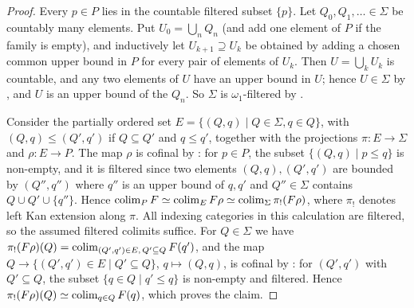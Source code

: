 	\begin{proof}
		Every $p \in P$ lies in the countable filtered subset $\{p\}$. Let $Q_0,Q_1,\dots \in \Sigma$ be countably many elements. Put $U_0 = \bigcup_n Q_n$ (and add one element of $P$ if the family is empty), and inductively let $U_{k+1} \supseteq U_k$ be obtained by adding a chosen common upper bound in $P$ for every pair of elements of $U_k$. Then $U = \bigcup_k U_k$ is countable, and any two elements of $U$ have an upper bound in $U$; hence $U \in \Sigma$ by , and $U$ is an upper bound of the $Q_n$. So $\Sigma$ is $\omega_1$-filtered by .

		Consider the partially ordered set $E = \{(Q,q) \mid Q \in \Sigma, q \in Q\}$, with $(Q,q) \leq (Q',q')$ if $Q \subseteq Q'$ and $q \leq q'$, together with the projections $\pi\colon E \to \Sigma$ and $\rho\colon E \to P$. The map $\rho$ is cofinal by : for $p \in P$, the subset $\{(Q,q) \mid p \leq q\}$ is non-empty, and it is filtered since two elements $(Q,q),(Q',q')$ are bounded by $(Q'',q'')$ where $q''$ is an upper bound of $q,q'$ and $Q'' \in \Sigma$ contains $Q \cup Q' \cup \{q''\}$. Hence $\operatorname{colim}_P F \simeq \operatorname{colim}_E F\rho \simeq \operatorname{colim}_{\Sigma} \pi_!(F\rho)$, where $\pi_!$ denotes left Kan extension along $\pi$. All indexing categories in this calculation are filtered, so the assumed filtered colimits suffice. For $Q \in \Sigma$ we have $\pi_!(F\rho)(Q) = \operatorname{colim}_{(Q',q') \in E,\, Q' \subseteq Q} F(q')$, and the map $Q \to \{(Q',q') \in E \mid Q' \subseteq Q\}$, $q \mapsto (Q,q)$, is cofinal by : for $(Q',q')$ with $Q' \subseteq Q$, the subset $\{q \in Q \mid q' \leq q\}$ is non-empty and filtered. Hence $\pi_!(F\rho)(Q) \simeq \operatorname{colim}_{q \in Q} F(q)$, which proves the claim.
	\end{proof}

